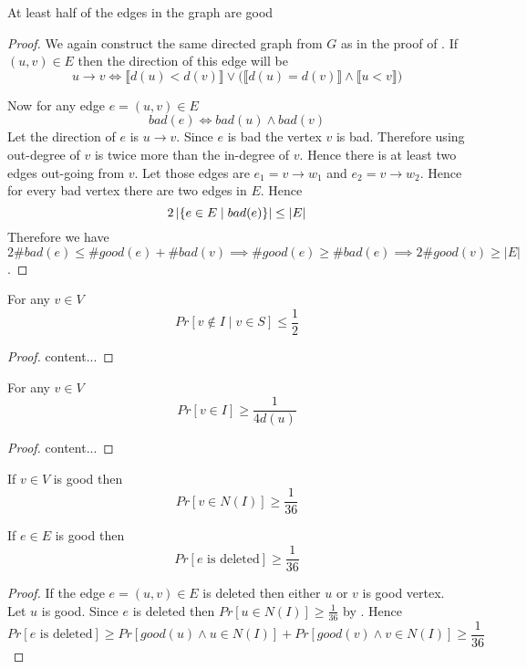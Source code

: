\begin{lemma}\label{halfgood}
	At least half of the edges in the graph are good
\end{lemma}
\begin{proof}
	We again construct the same directed graph from $G$ as in the proof of . If $(u,v)\in E$ then the direction of this edge will be $$u\to v\iff \llbracket d(u)<d(v)\rrbracket \vee \Big(\llbracket d(u)=d(v)\rrbracket\wedge \llbracket u<v\rrbracket\Big)$$
	
	Now for any edge $e=(u,v)\in E$ $$bad(e)\iff bad(u)\wedge bad(v)$$Let the direction of $e$ is $u\to v$. Since $e$ is bad the vertex $v$ is bad. Therefore using  out-degree of $v$ is twice more than the in-degree of $v$. Hence there is at least two edges out-going from $v$. Let those edges are $e_1=v\to w_1$ and $e_2=v\to w_2$. Hence for every bad vertex there are two edges in $E$. Hence $$2\left|\{ e\in E\mid bad(e)\}\right| \leq |E|$$Therefore we have $2 \#bad(e)\leq \#good(e)+\#bad(v)\implies \#good(e)\geq \#bad(e)\implies 2\#good(v)\geq |E|$.
\end{proof}


\begin{lemma}
		For any $v\in V$ $$Pr[v\notin I\mid v\in S]\leq \frac12$$
\end{lemma}
\begin{proof}
	content...
\end{proof}

\begin{lemma}
		For any $v\in V$ $$Pr[v\in I]\geq \frac{1}{4d(u)}$$
\end{lemma}
\begin{proof}
	content...
\end{proof}

\begin{lemma}\label{goodvinnbhd136}
	If $v\in V$ is good then $$Pr[v\in N(I)]\geq \frac1{36}$$
\end{lemma}

\begin{lemma}\label{goodedeleted}
	If $e\in E$ is good then $$Pr[\text{$e$ is deleted}]\geq \frac1{36}$$
\end{lemma}
\begin{proof}
	If the edge $e=(u,v)\in E$ is deleted then either $u$ or $v$ is good vertex. Let $u$ is good. Since $e$ is deleted then $Pr[u\in N(I)]\geq \frac1{36}$ by . Hence $$Pr[\text{$e$ is deleted}]\geq Pr[good(u)\wedge u\in N(I)] + Pr[good(v)\wedge v\in N(I)]\geq \frac1{36}$$
\end{proof}

